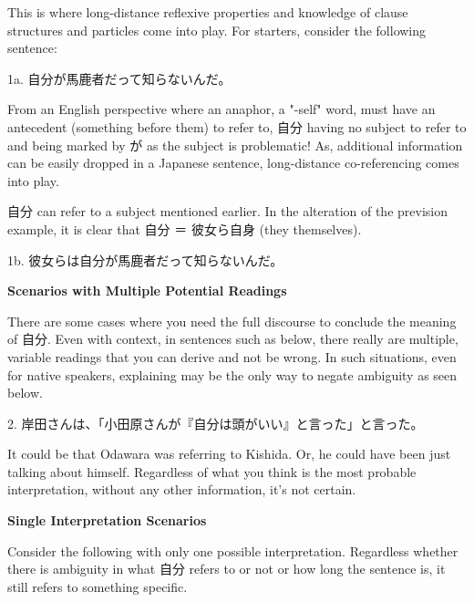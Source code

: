 \par{ This is where long-distance reflexive properties and knowledge of clause structures and particles come into play. For starters, consider the following sentence: }

\par{1a. 自分が馬鹿者だって知らないんだ。 }

\par{ From an English perspective where an anaphor, a "-self" word, must have an antecedent (something before them) to refer to, 自分 having no subject to refer to and being marked by が as the subject is problematic! As, additional information can be easily dropped in a Japanese sentence, long-distance co-referencing comes into play. }

\par{ 自分 can refer to a subject mentioned earlier. In the alteration of the prevision example, it is clear that 自分 ＝ 彼女ら自身 (they themselves). }

\par{1b. 彼女らは自分が馬鹿者だって知らないんだ。 }

\begin{center}
 \textbf{Scenarios with Multiple Potential Readings }
\end{center}

\par{ There are some cases where you need the full discourse to conclude the meaning of 自分. Even with context, in sentences such as below, there really are multiple, variable readings that you can derive and not be wrong. In such situations, even for native speakers, explaining may be the only way to negate ambiguity as seen below. }

\par{2. 岸田さんは、「小田原さんが『自分は頭がいい』と言った」と言った。 }

\par{It could be that Odawara was referring to Kishida. Or, he could have been just talking about himself. Regardless of what you think is the most probable interpretation, without any other information, it's not certain. }

\begin{center}
 \textbf{Single Interpretation Scenarios }
\end{center}

\par{ Consider the following with only one possible interpretation. Regardless whether there is ambiguity in what 自分 refers to or not or how long the sentence is, it still refers to something specific. }

